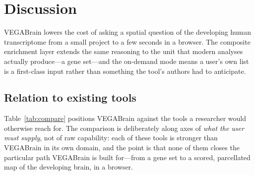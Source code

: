 \documentclass[pdflatex,sn-basic]{sn-jnl}
\begin{document}
\section{Discussion}\label{sec:discussion}

VEGABrain lowers the cost of asking a spatial question of the developing human
transcriptome from a small project to a few seconds in a browser. The composite enrichment layer extends the same reasoning to the
unit that modern analyses actually produce---a gene set---and the on-demand mode
means a user's own list is a first-class input rather than something the tool's
authors had to anticipate.

\subsection{Relation to existing tools}\label{sec:comparison}

Table~\ref{tab:compare} positions VEGABrain against the tools a researcher would
otherwise reach for. The comparison is deliberately along axes of \emph{what the
user must supply}, not of raw capability: each of these tools is stronger than
VEGABrain in its own domain, and the point is that none of them closes the
particular path VEGABrain is built for---from a gene set to a scored,
parcellated map of the developing brain, in a browser.
\end{document}
